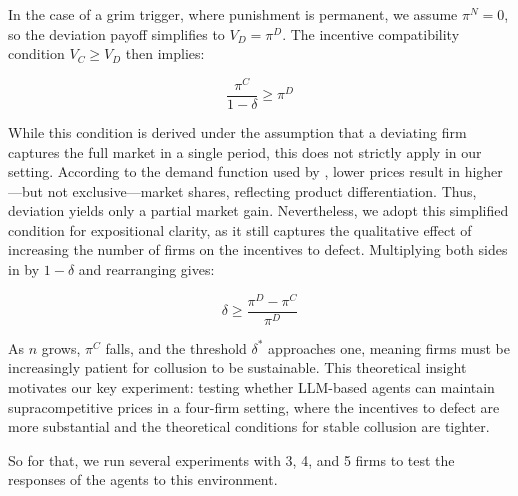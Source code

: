 In the case of a grim trigger, where punishment is permanent, we assume $\pi^N = 0$, so the deviation payoff simplifies to $V_D = \pi^D$. The incentive compatibility condition $V_C \geq V_D$ then implies:

\begin{equation}\label{eq:inc}
    \frac{\pi^C}{1 - \delta} \geq \pi^D
\end{equation}

While this condition is derived under the assumption that a deviating firm captures the full market in a single period, this does not strictly apply in our setting. According to the demand function used by \textcite{calvano_artificial_2020}, lower prices result in higher—but not exclusive—market shares, reflecting product differentiation. Thus, deviation yields only a partial market gain. Nevertheless, we adopt this simplified condition for expositional clarity, as it still captures the qualitative effect of increasing the number of firms on the incentives to defect. Multiplying both sides in  by $1 - \delta$ and rearranging gives:

\begin{equation}
    \delta \geq \frac{\pi^D - \pi^C}{\pi^D}
\end{equation}

As $n$ grows, $\pi^C$ falls, and the threshold $\delta^*$ approaches one, meaning firms must be increasingly patient for collusion to be sustainable. This theoretical insight motivates our key experiment: testing whether LLM-based agents can maintain supracompetitive prices in a four-firm setting, where the incentives to defect are more substantial and the theoretical conditions for stable collusion are tighter.


So for that, we run several experiments with 3, 4, and 5 firms to test the responses of the agents to this environment.





